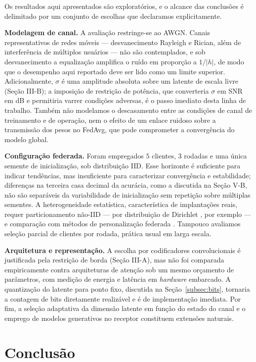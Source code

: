 \documentclass[conference,twocolumn]{IEEEtran}
\begin{document}
Os resultados aqui apresentados são exploratórios, e o alcance das conclusões é delimitado por um conjunto de escolhas que declaramos explicitamente.

\textbf{Modelagem de canal.} A avaliação restringe-se ao AWGN. Canais representativos de redes móveis --- desvanecimento Rayleigh e Rician, além de interferência de múltiplos usuários --- não são contemplados, e sob desvanecimento a equalização amplifica o ruído em proporção a $1/|h|$, de modo que o desempenho aqui reportado deve ser lido como um limite superior. Adicionalmente, $\sigma$ é uma amplitude absoluta sobre um latente de escala livre (Seção III-B); a imposição de restrição de potência, que converteria $\sigma$ em SNR em dB e permitiria varrer condições adversas, é o passo imediato desta linha de trabalho. Também não modelamos o descasamento entre as condições de canal de treinamento e de operação, nem o efeito de um enlace ruidoso sobre a transmissão dos pesos no FedAvg, que pode comprometer a convergência do modelo global.

\textbf{Configuração federada.} Foram empregados $5$ clientes, $3$ rodadas e uma única semente de inicialização, sob distribuição IID. Esse horizonte é suficiente para indicar tendências, mas insuficiente para caracterizar convergência e estabilidade; diferenças na terceira casa decimal da acurácia, como a discutida na Seção V-B, não são separáveis da variabilidade de inicialização sem repetição sobre múltiplas sementes. A heterogeneidade estatística, característica de implantações reais, requer particionamento não-IID --- por distribuição de Dirichlet \cite{hsu2019dirichlet}, por exemplo --- e comparação com métodos de personalização federada \cite{peng2024psfl, wang2024fedcl}. Tampouco avaliamos seleção parcial de clientes por rodada, prática usual em larga escala.

\textbf{Arquitetura e representação.} A escolha por codificadores convolucionais é justificada pela restrição de borda (Seção III-A), mas não foi comparada empiricamente contra arquiteturas de atenção sob um mesmo orçamento de parâmetros, com medição de energia e latência em \textit{hardware} embarcado. A quantização do latente para ponto fixo, discutida na Seção~\ref{subsec:bits}, tornaria a contagem de bits diretamente realizável e é de implementação imediata. Por fim, a seleção adaptativa da dimensão latente em função do estado do canal e o emprego de modelos generativos no receptor constituem extensões naturais.

\section{Conclusão}
\end{document}
